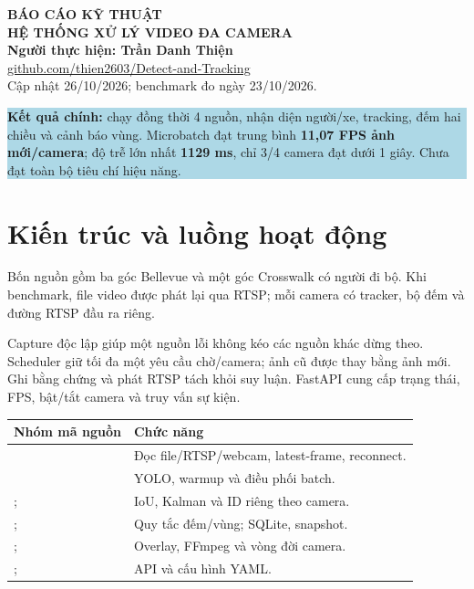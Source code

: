 \documentclass[11pt,a4paper]{article}
\newcommand{\note}[1]{\par\smallskip\colorbox{lightblue}{\parbox{\dimexpr\linewidth-2\fboxsep\relax}{#1}}\par\smallskip}
\begin{document}
\begin{center}
{\fontsize{21}{25}\selectfont\color{navy}\bfseries BÁO CÁO KỸ THUẬT}\\[6pt]
{\fontsize{16}{20}\selectfont\color{navy}\bfseries HỆ THỐNG XỬ LÝ VIDEO ĐA CAMERA}\\[8pt]
\textbf{Người thực hiện: Trần Danh Thiện}\\
\href{https://github.com/thien2603/Detect-and-Tracking}{github.com/thien2603/Detect-and-Tracking}\\
{\small Cập nhật 26/10/2026; benchmark đo ngày 23/10/2026.}
\end{center}
\note{\textbf{Kết quả chính:} chạy đồng thời 4 nguồn, nhận diện người/xe, tracking, đếm hai chiều và cảnh báo vùng. Microbatch đạt trung bình \textbf{11,07 FPS ảnh mới/camera}; độ trễ lớn nhất \textbf{1129 ms}, chỉ 3/4 camera đạt dưới 1 giây. Chưa đạt toàn bộ tiêu chí hiệu năng.}

\section{Kiến trúc và luồng hoạt động}
Bốn nguồn gồm ba góc Bellevue và một góc Crosswalk có người đi bộ. Khi benchmark, file video được phát lại qua RTSP; mỗi camera có tracker, bộ đếm và đường RTSP đầu ra riêng.
\begin{center}
\end{center}
Capture độc lập giúp một nguồn lỗi không kéo các nguồn khác dừng theo. Scheduler giữ tối đa một yêu cầu chờ/camera; ảnh cũ được thay bằng ảnh mới. Ghi bằng chứng và phát RTSP tách khỏi suy luận. FastAPI cung cấp trạng thái, FPS, bật/tắt camera và truy vấn sự kiện.

{\small\begin{tabularx}{\linewidth}{p{64mm}Y}
\toprule{}\textbf{Nhóm mã nguồn} & \textbf{Chức năng}\\\midrule
{} & Đọc file/RTSP/webcam, latest-frame, reconnect.\\
 & YOLO, warmup và điều phối batch.\\
;  & IoU, Kalman và ID riêng theo camera.\\
;  & Quy tắc đếm/vùng; SQLite, snapshot.\\
;  & Overlay, FFmpeg và vòng đời camera.\\
;  & API và cấu hình YAML.\\
\bottomrule\end{tabularx}}
\end{document}
